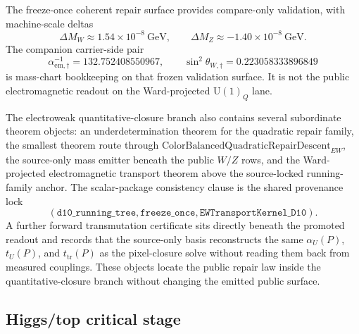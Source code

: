 \documentclass[11pt]{article}
\newcommand{\U}{\mathrm{U}}
\begin{document}
The freeze-once coherent repair surface provides compare-only validation, with machine-scale deltas
\[
\Delta M_W\approx 1.54\times 10^{-8}~\mathrm{GeV},
\qquad
\Delta M_Z\approx -1.40\times 10^{-8}~\mathrm{GeV}.
\]
The companion carrier-side pair
\[
\alpha_{\mathrm{em},\dagger}^{-1}=132.752408550967,
\qquad
\sin^2\theta_{W,\dagger}=0.223058333896849
\]
is mass-chart bookkeeping on that frozen validation surface. It is not the public electromagnetic
readout on the Ward-projected \(\U(1)_Q\) lane.

The electroweak quantitative-closure branch also contains several subordinate theorem objects: an
underdetermination theorem for the quadratic repair family, the smallest theorem route
through \(\mathrm{ColorBalancedQuadraticRepairDescent}_{EW}\), the source-only mass emitter
beneath the public \(W/Z\) rows, and the Ward-projected electromagnetic transport theorem above
the source-locked running-family anchor. The scalar-package consistency clause is the shared
provenance lock
\[
(\texttt{d10\_running\_tree},\texttt{freeze\_once},\texttt{EWTransportKernel\_D10}).
\]
A further forward transmutation certificate sits directly beneath the promoted readout and
records that the source-only basis reconstructs the same \(\alpha_U(P)\), \(t_U(P)\), and
\(t_{\mathrm{tr}}(P)\) as the pixel-closure solve without reading them back from measured
couplings. These objects locate the public repair law inside the quantitative-closure branch without
changing the emitted public surface.

\subsection{Higgs/top critical stage}
\end{document}
